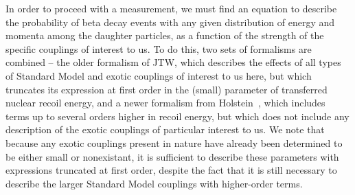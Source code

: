 In order to proceed with a measurement, we must find an equation to describe the probability of beta decay events with any given distribution of energy and momenta among the daughter particles, as a function of the strength of the specific couplings of interest to us.  To do this, two sets of formalisms are combined -- the older formalism of JTW, %
which describes the effects of all types of Standard Model and exotic couplings of interest to us here, but which truncates its expression at first order in the (small) parameter of transferred nuclear recoil energy, and a newer formalism from Holstein~\cite{holstein}, which includes terms up to several orders higher in recoil energy, but which does not include any description of the exotic couplings of particular interest to us.  We note that because any exotic couplings present in nature have already been determined to be either small or nonexistant, it is sufficient to describe these parameters with expressions truncated at first order, despite the fact that it is still necessary to describe the larger Standard Model couplings with higher-order terms. 

	
